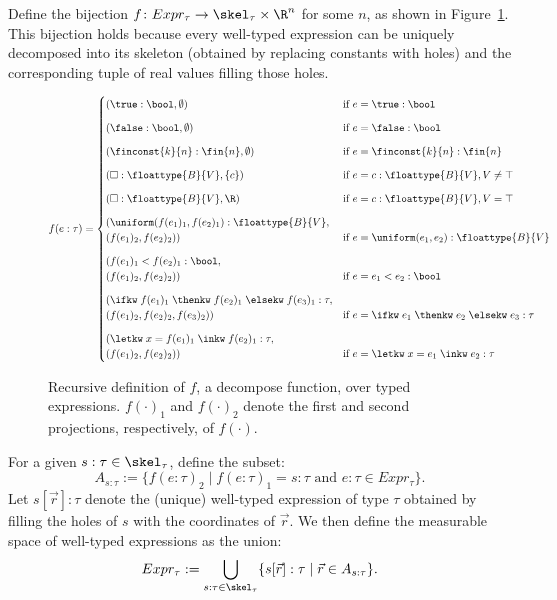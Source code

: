 Define the bijection $f\colon Expr_{\tau} \to \skel_{\tau} \times \R^n$ for some $n$, as shown in Figure~\ref{fig:decompose-definition}. This bijection holds because every well-typed expression can be uniquely decomposed into its skeleton (obtained by replacing constants with holes) and the corresponding tuple of real values filling those holes.

\begin{figure}[t]
	\centering
	\begin{align*}
		f(e : \tau) = 
		\begin{cases}
			(\true : \bool, \emptyset)
				& \text{if } e = \true : \bool \\[8pt]
			(\false : \bool, \emptyset)
				& \text{if } e = \false : \bool \\[8pt]
			(\finconst{k}{n} : \fin{n}, \emptyset)
				& \text{if } e = \finconst{k}{n} : \fin{n} \\[8pt]
			(\square : \floattype{B}{V}, \{c\})
				& \text{if } e = c : \floattype{B}{V}, V \neq \top \\[8pt]
			(\square : \floattype{B}{V}, \R)
				& \text{if } e = c : \floattype{B}{V}, V = \top \\[8pt]
			(\uniform(f(e_1)_1, f(e_2)_1) : \floattype{B}{V}, \\
			(f(e_1)_2, f(e_2)_2))
				& \text{if } e = \uniform(e_1, e_2) : \floattype{B}{V} \\[8pt]
			(f(e_1)_1 < f(e_2)_1 : \bool, \\
			(f(e_1)_2, f(e_2)_2))
				& \text{if } e = e_1 < e_2 : \bool \\[8pt]
			(\ifkw\; f(e_1)_1\; \thenkw\; f(e_2)_1\; \elsekw\; f(e_3)_1 : \tau, \\
			(f(e_1)_2, f(e_2)_2, f(e_3)_2))
				& \text{if } e = \ifkw\; e_1\; \thenkw\; e_2\; \elsekw\; e_3 : \tau \\[8pt]
			(\letkw\; x = f(e_1)_1\; \inkw\; f(e_2)_1 : \tau, \\
			(f(e_1)_2, f(e_2)_2))
				& \text{if } e = \letkw\; x = e_1\; \inkw\; e_2 : \tau
		\end{cases}
	\end{align*}
	\caption{Recursive definition of $f$, a decompose function, over typed expressions. $f(\cdot)_1$ and $f(\cdot)_2$ denote the first and second projections, respectively, of $f(\cdot)$.}
	\label{fig:decompose-definition}
\end{figure}
	
\begin{definition}
	For a given $s : \tau \in \skel_{\tau}$, define the subset:
	\[
		A_{s : \tau} := \{f(e : \tau)_2 \mid f(e : \tau)_1 = s : \tau \text{ and } e : \tau \in Expr_{\tau}\}.
	\]
	Let $s[\vec{r}] : \tau$ denote the (unique) well-typed expression of type $\tau$ obtained by filling the holes of $s$ with the coordinates of $\vec{r}$. We then define the measurable space of well-typed expressions as the union:
	\[
		Expr_{\tau} := \bigcup_{s : \tau \in \skel_{\tau}} \{s[\vec{r}] : \tau \mid \vec{r} \in A_{s : \tau}\}.
	\]
\end{definition}

